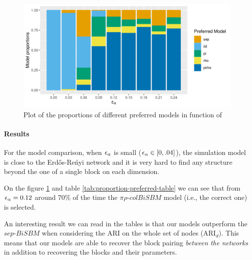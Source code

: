 \begin{figure}
\centering
\includegraphics{./img/54eb0a21b143a53b6199a869d7a228ad7d158e57.png}
\caption{\label{fig:inference-proportion-preferred}Plot of the
proportions of different preferred models in function of \eps[\alpha]}
\end{figure}

\paragraph{Results}

For the model comparison, when \(\eps[\alpha]\) is small
(\(\eps[\alpha]\in[0, .04]\)), the simulation model is close to the
Erd\H{o}s-Reńyi network and it is very hard to find any structure beyond
the one of a single block on each dimension.

On the figure \ref{fig:inference-proportion-preferred} and table
\ref{tab:proportion-preferred-table} we can see that from
\(\eps[\alpha] = 0.12\) around \(70\%\) of the time the
\(\pi\rho\text{-}colBiSBM\) model (i.e., the correct one) is selected.

An interesting result we can read in the tables is that our models
outperform the \(sep\text{-}BiSBM\) when considering the ARI on the
whole set of nodes (\(\text{ARI}_d\)). This means that our models are
able to recover the block pairing \emph{between the networks} in
addition to recovering the blocks and their parameters.
